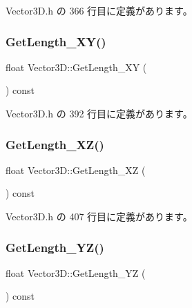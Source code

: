  Vector3\+D.\+h の 366 行目に定義があります。

\mbox{\label{class_vector3_d_abaf2a0ccb78fdf2c3a393959e9c29708}} 
\subsubsection{\texorpdfstring{Get\+Length\+\_\+\+X\+Y()}{GetLength\_XY()}}
{\footnotesize\ttfamily float Vector3\+D\+::\+Get\+Length\+\_\+\+XY (\begin{DoxyParamCaption}{ }\end{DoxyParamCaption}) const\hspace{0.3cm}{\ttfamily [inline]}}



 Vector3\+D.\+h の 392 行目に定義があります。

\mbox{\label{class_vector3_d_ae61982f6eb062257652f624ab1801089}} 
\subsubsection{\texorpdfstring{Get\+Length\+\_\+\+X\+Z()}{GetLength\_XZ()}}
{\footnotesize\ttfamily float Vector3\+D\+::\+Get\+Length\+\_\+\+XZ (\begin{DoxyParamCaption}{ }\end{DoxyParamCaption}) const\hspace{0.3cm}{\ttfamily [inline]}}



 Vector3\+D.\+h の 407 行目に定義があります。

\mbox{\label{class_vector3_d_a183854c5c7ea8bf32f752a02cf3fc3ce}} 
\subsubsection{\texorpdfstring{Get\+Length\+\_\+\+Y\+Z()}{GetLength\_YZ()}}
{\footnotesize\ttfamily float Vector3\+D\+::\+Get\+Length\+\_\+\+YZ (\begin{DoxyParamCaption}{ }\end{DoxyParamCaption}) const\hspace{0.3cm}{\ttfamily [inline]}}



